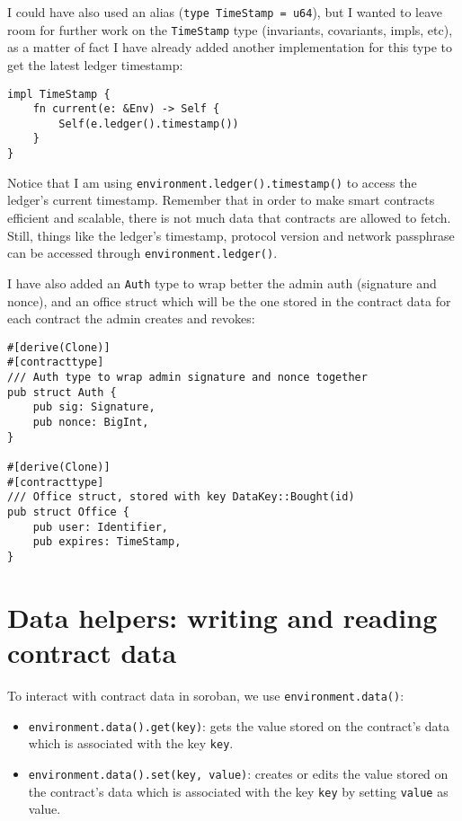 \documentclass[10pt]{article}
\begin{document}
I could have also used an alias (\texttt{type TimeStamp = u64}), but I wanted to leave room for further work on the \texttt{TimeStamp} type (invariants, covariants, impls, etc), as a matter of fact I have already added another implementation for this type to get the latest ledger timestamp:

\begin{verbatim}
impl TimeStamp {
    fn current(e: &Env) -> Self {
        Self(e.ledger().timestamp())
    }
}
\end{verbatim}

Notice that I am using \texttt{environment.ledger().timestamp()} to access the ledger's current timestamp. Remember that in order to make smart contracts efficient and scalable, there is not much data that contracts are allowed to fetch. Still, things like the ledger's timestamp, protocol version and network passphrase can be accessed through \texttt{environment.ledger()}.

I have also added an \texttt{Auth} type to wrap better the admin auth (signature and nonce), and an office struct which will be the one stored in the contract data for each contract the admin creates and revokes:

\begin{verbatim}
#[derive(Clone)]
#[contracttype]
/// Auth type to wrap admin signature and nonce together
pub struct Auth {
    pub sig: Signature,
    pub nonce: BigInt,
}

#[derive(Clone)]
#[contracttype]
/// Office struct, stored with key DataKey::Bought(id)
pub struct Office {
    pub user: Identifier,
    pub expires: TimeStamp,
}
\end{verbatim}

\section*{Data helpers: writing and reading contract data}
To interact with contract data in soroban, we use \texttt{environment.data()}:

\begin{itemize}
  \item \texttt{environment.data().get(key)}: gets the value stored on the contract's data which is associated with the key \texttt{key}.
  \item \texttt{environment.data().set(key, value)}: creates or edits the value stored on the contract's data which is associated with the key \texttt{key} by setting \texttt{value} as value.
\end{itemize}
\end{document}
